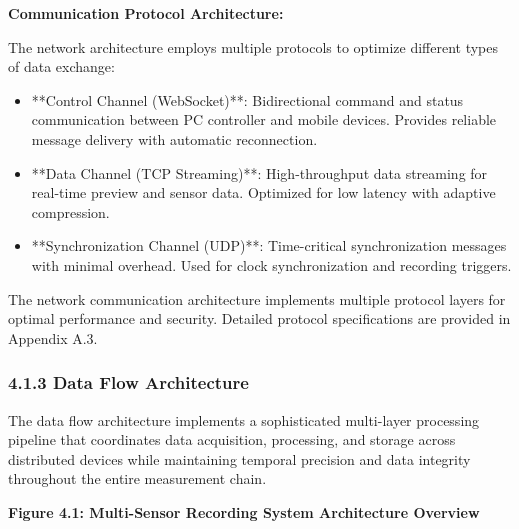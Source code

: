 \documentclass[12pt,a4paper]{article}
\begin{document}
\textbf{Communication Protocol Architecture:}

The network architecture employs multiple protocols to optimize different types of data exchange:

\begin{itemize}
\item **Control Channel (WebSocket)**: Bidirectional command and status communication between PC controller and mobile
  devices. Provides reliable message delivery with automatic reconnection.
\item **Data Channel (TCP Streaming)**: High-throughput data streaming for real-time preview and sensor data. Optimized for
  low latency with adaptive compression.
\item **Synchronization Channel (UDP)**: Time-critical synchronization messages with minimal overhead. Used for clock
  synchronization and recording triggers.

\end{itemize}
The network communication architecture implements multiple protocol layers for optimal performance and security.
Detailed protocol specifications are provided in Appendix A.3.

\subsubsection{4.1.3 Data Flow Architecture}

The data flow architecture implements a sophisticated multi-layer processing pipeline that coordinates data acquisition,
processing, and storage across distributed devices while maintaining temporal precision and data integrity throughout
the entire measurement chain.

\textbf{Figure 4.1: Multi-Sensor Recording System Architecture Overview}
\end{document}
